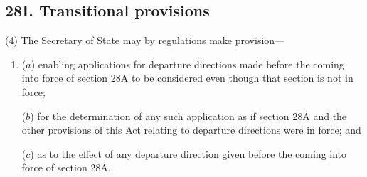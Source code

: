 \documentclass[12pt,a4paper]{article}
\begin{document}

%


\subsection{28I. Transitional provisions}

%
%
%

(4) The Secretary of State may by regulations make provision—
\begin{enumerate}\item[]
($a$) enabling applications for departure directions made before the coming into force of section 28A to be considered even though that section is not in force;

($b$) for the determination of any such application as if section 28A and the other provisions of this Act relating to departure directions were in force; and

($c$) as to the effect of any departure direction given before the coming into force of section 28A.
\end{enumerate}
\end{document}
